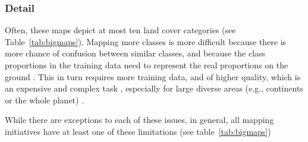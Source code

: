     \subsubsection{Detail}
Often, these maps depict at most ten land cover categories (see Table~\ref{tab:bigmaps}). Mapping more classes is more difficult because there is more chance of confusion between similar classes, and because the class proportions in the training data need to represent the real proportions on the ground \citep{kleinewillinghofer2022unbiased}. This in turn requires more training data, and of higher quality, which is an expensive and complex task \citep{li2021improving}, especially for large diverse areas (e.g., continents or the whole planet) \citep{tsendbazar2021towards,stanimirova2023global}.

    While there are exceptions to each of these issues, in general, all mapping initiatives have at least one of these limitations (see table~\ref{tab:bigmaps})

